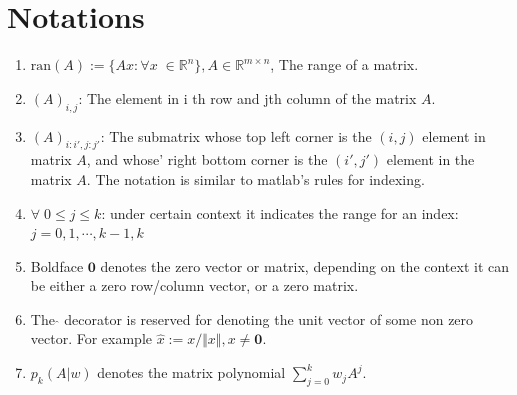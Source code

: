 \documentclass[]{article}
\theoremstyle{definition}
\begin{document}
\section{Notations}
\begin{enumerate}
    \item $\text{ran}(A):=\{Ax :\forall x \; \in \mathbb R^n\}, A \in \mathbb R^{m\times n}$, The range of a matrix. 
    \item $(A)_{i, j}$: The element in i th row and jth column of the matrix $A$.
    \item $(A)_{i:i', j:j'}$: The submatrix whose top left corner is the $(i, j)$ element in matrix $A$, and whose' right bottom corner is the $(i', j ')$ element in the matrix $A$. The notation is similar to matlab's rules for indexing. 
    \item $\forall\; 0\le j \le k$: under certain context it indicates the range for an index: $j = 0, 1, \cdots, k-1, k$
    \item Boldface $\mathbf 0$ denotes the zero vector or matrix, depending on the context it can be either a zero row/column vector, or a zero matrix.
    \item The $\hat{}$ decorator is reserved for denoting the unit vector of some non zero vector. For example $\hat{x}:= x/\Vert x\Vert, x \neq \mathbf 0$. 
    \item $p_k(A|w)$ denotes the matrix polynomial $\sum_{j = 0}^k w_jA^j$. 
\end{enumerate}
\end{document}
